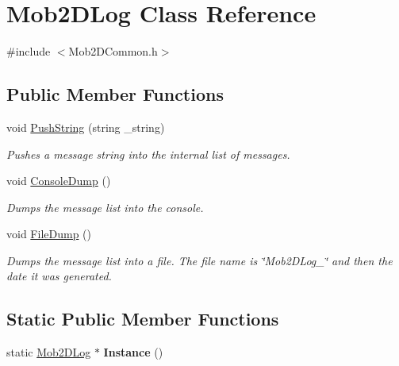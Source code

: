 \hypertarget{classMob2DLog}{
\section{Mob2DLog Class Reference}
\label{classMob2DLog}
}


{\ttfamily \#include $<$Mob2DCommon.h$>$}\subsection*{Public Member Functions}
\begin{DoxyCompactItemize}
\item 
\hypertarget{classMob2DLog_a969611bfb891d9790201b2738220f3e1}{
void \hyperlink{classMob2DLog_a969611bfb891d9790201b2738220f3e1}{PushString} (string \_\-string)}
\label{classMob2DLog_a969611bfb891d9790201b2738220f3e1}

\begin{DoxyCompactList}\small\item\em Pushes a message string into the internal list of messages. \item\end{DoxyCompactList}\item 
\hypertarget{classMob2DLog_ad10363ee836fcc38e18d77d4fdb4789c}{
void \hyperlink{classMob2DLog_ad10363ee836fcc38e18d77d4fdb4789c}{ConsoleDump} ()}
\label{classMob2DLog_ad10363ee836fcc38e18d77d4fdb4789c}

\begin{DoxyCompactList}\small\item\em Dumps the message list into the console. \item\end{DoxyCompactList}\item 
\hypertarget{classMob2DLog_ae363319ce957987735494c6b7d4147b3}{
void \hyperlink{classMob2DLog_ae363319ce957987735494c6b7d4147b3}{FileDump} ()}
\label{classMob2DLog_ae363319ce957987735494c6b7d4147b3}

\begin{DoxyCompactList}\small\item\em Dumps the message list into a file. The file name is \char`\"{}Mob2DLog\_\-\char`\"{} and then the date it was generated. \item\end{DoxyCompactList}\end{DoxyCompactItemize}
\subsection*{Static Public Member Functions}
\begin{DoxyCompactItemize}
\item 
\hypertarget{classMob2DLog_a99c6dba3c5c9a9d5ce990ec4e96e0858}{
static \hyperlink{classMob2DLog}{Mob2DLog} $\ast$ {\bfseries Instance} ()}
\label{classMob2DLog_a99c6dba3c5c9a9d5ce990ec4e96e0858}

\end{DoxyCompactItemize}
